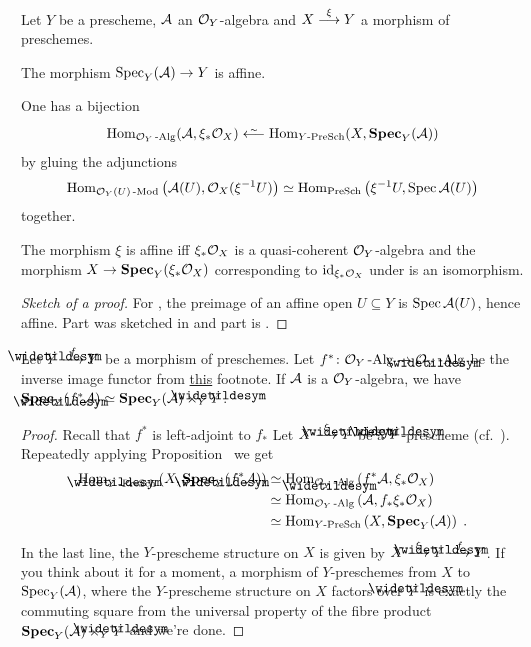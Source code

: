 \documentclass[a4paper,parskip=half,numbers=enddot, DIV=12]{scrreprt}
\begin{document}
\begin{prop}
	Let $Y$ be a prescheme, $\mathcal{A}$ an $\mathcal{O}_Y$-algebra and $X\morphism[\xi]Y$ a morphism of preschemes.
	\begin{alphanumerate}
		\item The morphism $\Spec_Y(\Aa)\morphism Y$ is affine.
		\item One has a bijection
		\begin{align}\lbl{eq:SPECAdjunction}
			\Hom_{\Oo_Y\cat{-Alg}}(\Aa,\xi_*\Oo_X)\lisomorphism\Hom_{Y\!\cat{-PreSch}}(X,\SPEC_Y(\Aa))
		\end{align}
		by gluing the adjunctions 
		\begin{align*}
			\operatorname{Hom}_{\mathcal{O}_Y(U)\operatorname{-Mod}}\left(\mathcal{A}(U),\mathcal{O}_X(\xi^{-1}U)\right)\simeq \operatorname{Hom}_{\operatorname{PreSch}}\left(\xi^{-1}U,\operatorname{Spec} \mathcal{A}(U)\right)
		\end{align*}
		together.
		\item The morphism $\xi$ is affine iff $\xi_*\mathcal{O}_X$ is a quasi-coherent $\mathcal{O}_Y$-algebra and the morphism $X\morphism\SPEC_Y(\xi_*\Oo_X)$ corresponding to $\operatorname{id}_{\xi_*\mathcal{O}_X}$ under  is an isomorphism.
	\end{alphanumerate}
\end{prop}
\begin{proof}[Sketch of a proof]
	For , the preimage of an affine open $U\subseteq Y$ is $\operatorname{Spec} \mathcal{A}(U)$, hence affine. Part  was sketched in \cite[Proposition~2.5.1]{alggeo1} and part  is \cite[Lemma~2.5.1]{alggeo1}.
\end{proof}
\begin{cor}
	Let $\snake{Y}\morphism[f] Y$ be a morphism of preschemes. Let $f^*\colon \Oo_Y\cat{-Alg}\morphism\Oo_{\snake{Y}}\cat{-Alg}$ be the inverse image functor from \hyperref[footnote:f^*]{this} footnote. If $\mathcal{A}$ is a $\mathcal{O}_Y$-algebra, we have $\SPEC_{\snake{Y}}(f^*\Aa)\simeq \SPEC_Y(\Aa)\times_Y\snake{Y}$.
\end{cor}
\begin{proof}
	Recall that $f^*$ is left-adjoint to $f_*$ Let $X\morphism[\xi]\snake{Y}$ be a $\snake{Y}$-prescheme (cf.\ \cite[Definition~1.5.7]{alggeo1}). Repeatedly applying Proposition~ we get
	\begin{align*}
		\Hom_{\snake{Y}\cat{-PreSch}}\left(X,\SPEC_{\snake{Y}}(f^*\Aa)\right)&\simeq \Hom_{\Oo_{\snake{Y}}\cat{-Alg}}\left(f^*\Aa,\xi_*\Oo_X\right)\\
		&\simeq\Hom_{\Oo_Y\cat{-Alg}}\left(\Aa,f_*\xi_*\Oo_X\right)\\
		&\simeq \Hom_{Y\!\cat{-PreSch}}\left(X,\SPEC_Y(\Aa)\right)\;.
	\end{align*}
	In the last line, the $Y$-prescheme structure on $X$ is given by $X\morphism[\xi]\snake{Y}\morphism[f]Y$. If you think about it for a moment, a morphism of $Y$-preschemes from $X$ to $\operatorname{Spec}_Y(\mathcal{A})$, where the $Y$-prescheme structure on $X$ factors over $\snake{Y}$ is exactly the commuting square from the universal property of the fibre product $\SPEC_Y(\Aa)\times_Y\snake{Y}$ and we're done.
\end{proof}
\end{document}
